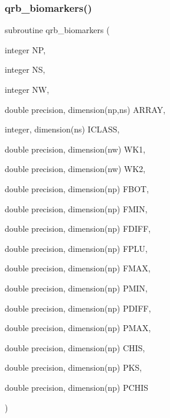 \subsubsection{\texorpdfstring{qrb\+\_\+biomarkers()}{qrb\_biomarkers()}}
{\footnotesize\ttfamily subroutine qrb\+\_\+biomarkers (\begin{DoxyParamCaption}\item[{integer}]{NP,  }\item[{integer}]{NS,  }\item[{integer}]{NW,  }\item[{double precision, dimension(np,ns)}]{A\+R\+R\+AY,  }\item[{integer, dimension(ns)}]{I\+C\+L\+A\+SS,  }\item[{double precision, dimension(nw)}]{W\+K1,  }\item[{double precision, dimension(nw)}]{W\+K2,  }\item[{double precision, dimension(np)}]{F\+B\+OT,  }\item[{double precision, dimension(np)}]{F\+M\+IN,  }\item[{double precision, dimension(np)}]{F\+D\+I\+FF,  }\item[{double precision, dimension(np)}]{F\+P\+LU,  }\item[{double precision, dimension(np)}]{F\+M\+AX,  }\item[{double precision, dimension(np)}]{P\+M\+IN,  }\item[{double precision, dimension(np)}]{P\+D\+I\+FF,  }\item[{double precision, dimension(np)}]{P\+M\+AX,  }\item[{double precision, dimension(np)}]{C\+H\+IS,  }\item[{double precision, dimension(np)}]{P\+KS,  }\item[{double precision, dimension(np)}]{P\+C\+H\+IS }\end{DoxyParamCaption})}

